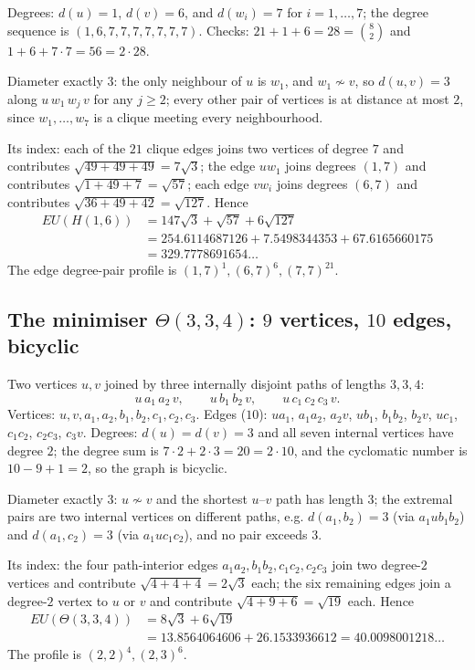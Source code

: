 \documentclass[11pt]{amsart}
\theoremstyle{remark}
\newcommand{\EU}{\mathit{EU}}
\begin{document}
Degrees: $d(u)=1$, $d(v)=6$, and $d(w_i)=7$ for $i=1,\ldots,7$; the degree
sequence is $(1,6,7,7,7,7,7,7,7)$. Checks: $21+1+6=28=\binom82$ and
$1+6+7\cdot7=56=2\cdot28$.

Diameter exactly $3$: the only neighbour of $u$ is $w_1$, and $w_1\not\sim v$,
so $d(u,v)=3$ along $u\,w_1\,w_j\,v$ for any $j\ge2$; every other pair of
vertices is at distance at most $2$, since $w_1,\ldots,w_7$ is a clique meeting
every neighbourhood.

Its index: each of the $21$ clique edges joins two vertices of degree $7$ and
contributes $\sqrt{49+49+49}=7\sqrt3$; the edge $uw_1$ joins degrees $(1,7)$
and contributes $\sqrt{1+49+7}=\sqrt{57}$; each edge $vw_i$ joins degrees
$(6,7)$ and contributes $\sqrt{36+49+42}=\sqrt{127}$. Hence
\begin{align*}
 \EU(H(1,6))&=147\sqrt3+\sqrt{57}+6\sqrt{127}\\
 &=254.6114687126+7.5498344353+67.6165660175\\
 &=329.7778691654\ldots
\end{align*}
The edge degree-pair profile is $(1,7)^1,(6,7)^6,(7,7)^{21}$.

\subsection*{The minimiser $\Theta(3,3,4)$: $9$ vertices, $10$ edges, bicyclic}
Two vertices $u,v$ joined by three internally disjoint paths of lengths
$3,3,4$:
\[
 u\,a_1\,a_2\,v,\qquad u\,b_1\,b_2\,v,\qquad u\,c_1\,c_2\,c_3\,v .
\]
Vertices: $u,v,a_1,a_2,b_1,b_2,c_1,c_2,c_3$. Edges ($10$):
$ua_1$, $a_1a_2$, $a_2v$, $ub_1$, $b_1b_2$, $b_2v$, $uc_1$, $c_1c_2$,
$c_2c_3$, $c_3v$.
Degrees: $d(u)=d(v)=3$ and all seven internal vertices have degree $2$; the
degree sum is $7\cdot2+2\cdot3=20=2\cdot10$, and the cyclomatic number is
$10-9+1=2$, so the graph is bicyclic.

Diameter exactly $3$: $u\not\sim v$ and the shortest $u$--$v$ path has length
$3$; the extremal pairs are two internal vertices on different paths, e.g.
$d(a_1,b_2)=3$ (via $a_1ub_1b_2$) and $d(a_1,c_2)=3$ (via $a_1uc_1c_2$), and no
pair exceeds $3$.

Its index: the four path-interior edges $a_1a_2,b_1b_2,c_1c_2,c_2c_3$ join two
degree-$2$ vertices and contribute $\sqrt{4+4+4}=2\sqrt3$ each; the six
remaining edges join a degree-$2$ vertex to $u$ or $v$ and contribute
$\sqrt{4+9+6}=\sqrt{19}$ each. Hence
\begin{align*}
 \EU(\Theta(3,3,4))&=8\sqrt3+6\sqrt{19}\\
 &=13.8564064606+26.1533936612=40.0098001218\ldots
\end{align*}
The profile is $(2,2)^4,(2,3)^6$.
\end{document}
